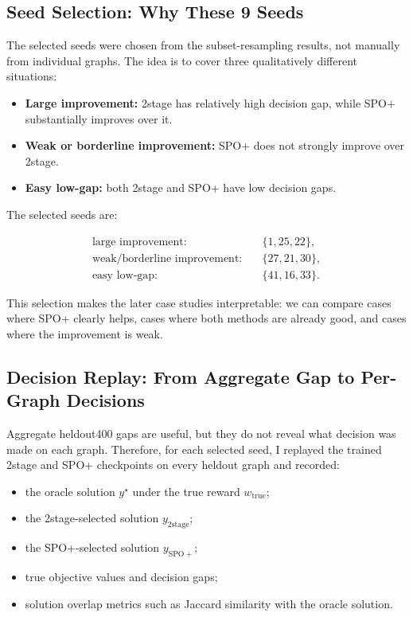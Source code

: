 \documentclass[11pt]{article}
\begin{document}
\subsection{Seed Selection: Why These 9 Seeds}
The selected seeds were chosen from the subset-resampling results, not manually
from individual graphs. The idea is to cover three qualitatively different
situations:

\begin{itemize}
    \item \textbf{Large improvement:} 2stage has relatively high decision gap,
    while SPO+ substantially improves over it.
    \item \textbf{Weak or borderline improvement:} SPO+ does not strongly
    improve over 2stage.
    \item \textbf{Easy low-gap:} both 2stage and SPO+ have low decision gaps.
\end{itemize}

The selected seeds are:

\[
\begin{aligned}
\text{large improvement:} &\quad \{1,25,22\},\\
\text{weak/borderline improvement:} &\quad \{27,21,30\},\\
\text{easy low-gap:} &\quad \{41,16,33\}.
\end{aligned}
\]

This selection makes the later case studies interpretable: we can compare
cases where SPO+ clearly helps, cases where both methods are already good, and
cases where the improvement is weak.

\subsection{Decision Replay: From Aggregate Gap to Per-Graph Decisions}
Aggregate heldout400 gaps are useful, but they do not reveal what decision was
made on each graph. Therefore, for each selected seed, I replayed the trained
2stage and SPO+ checkpoints on every heldout graph and recorded:

\begin{itemize}
    \item the oracle solution $y^\star$ under the true reward
    $w_{\mathrm{true}}$;
    \item the 2stage-selected solution $y_{\mathrm{2stage}}$;
    \item the SPO+-selected solution $y_{\mathrm{SPO+}}$;
    \item true objective values and decision gaps;
    \item solution overlap metrics such as Jaccard similarity with the oracle
    solution.
\end{itemize}
\end{document}
